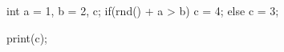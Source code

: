 \begin{minipage}[b]{2in}
\begin{AVerb}[numbers=left]
int a = 1, b = 2, c; \label{lst_back1_assign}
if(rnd() + a > b) \label{lst_back1_test}
  c = 4; \label{lst_back1_test_true}
else     
  c = 3; \label{lst_back1_test_false}

print(c); \label{lst_back1_print}
\end{AVerb}
\end{minipage}
